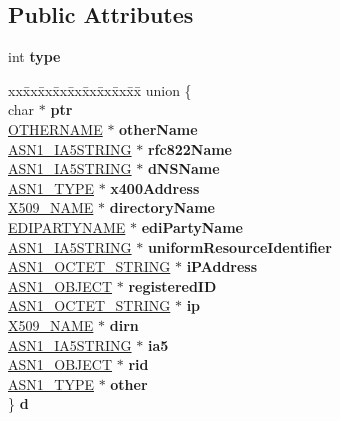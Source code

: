 \subsection*{Public Attributes}
\begin{DoxyCompactItemize}
\item 
\mbox{\label{structGENERAL__NAME__st_adee285a4ad25557f12d51af03e1cf0e2}} 
int {\bfseries type}
\item 
\mbox{\label{structGENERAL__NAME__st_a16928890b0ad45ace675d29ebdc138df}} 
\begin{tabbing}
xx\=xx\=xx\=xx\=xx\=xx\=xx\=xx\=xx\=\kill
union \{\\
\>char $\ast$ {\bfseries ptr}\\
\>\hyperlink{structotherName__st}{OTHERNAME} $\ast$ {\bfseries otherName}\\
\>\hyperlink{structasn1__string__st}{ASN1\_IA5STRING} $\ast$ {\bfseries rfc822Name}\\
\>\hyperlink{structasn1__string__st}{ASN1\_IA5STRING} $\ast$ {\bfseries dNSName}\\
\>\hyperlink{structasn1__type__st}{ASN1\_TYPE} $\ast$ {\bfseries x400Address}\\
\>\hyperlink{structX509__name__st}{X509\_NAME} $\ast$ {\bfseries directoryName}\\
\>\hyperlink{structEDIPartyName__st}{EDIPARTYNAME} $\ast$ {\bfseries ediPartyName}\\
\>\hyperlink{structasn1__string__st}{ASN1\_IA5STRING} $\ast$ {\bfseries uniformResourceIdentifier}\\
\>\hyperlink{structasn1__string__st}{ASN1\_OCTET\_STRING} $\ast$ {\bfseries iPAddress}\\
\>\hyperlink{structasn1__object__st}{ASN1\_OBJECT} $\ast$ {\bfseries registeredID}\\
\>\hyperlink{structasn1__string__st}{ASN1\_OCTET\_STRING} $\ast$ {\bfseries ip}\\
\>\hyperlink{structX509__name__st}{X509\_NAME} $\ast$ {\bfseries dirn}\\
\>\hyperlink{structasn1__string__st}{ASN1\_IA5STRING} $\ast$ {\bfseries ia5}\\
\>\hyperlink{structasn1__object__st}{ASN1\_OBJECT} $\ast$ {\bfseries rid}\\
\>\hyperlink{structasn1__type__st}{ASN1\_TYPE} $\ast$ {\bfseries other}\\
\} {\bfseries d}\\


\end{tabbing}
\end{DoxyCompactItemize}
